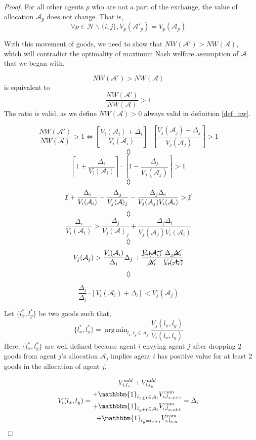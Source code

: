 \begin{proof}
For all other agents $p$ who are not a part of the exchange, the value of allocation $\mathcal{A}_p$ does not change. That is, 
\[
    \forall p \in \mathcal{N}\backslash\{i,j\}, V_p(\mathcal{A}'_p) = V_p(\mathcal{A}_p)
\]

With this movement of goods, we need to show that $NW(\mathcal{A}') > NW(\mathcal{A})$, which will contradict the optimality of maximum Nash welfare assumption of $\mathcal{A}$ that we began with.

\[
    NW(\mathcal{A}') > NW(\mathcal{A})
\]
is equivalent to
\[
    \frac{NW(\mathcal{A}')}{NW(\mathcal{A})} > 1
\]
The ratio is valid, as we define $NW(\mathcal{A}) > 0$ always valid in definition \ref{def_nw}.

$$
    \frac{NW(\mathcal{A}')}{NW(\mathcal{A})} > 1 \Leftrightarrow \left[ \frac{V_i(\mathcal{A}_i) + \Delta_i}{V_i(\mathcal{A}_i)} \right] \cdot \left[ \frac{V_j(\mathcal{A}_j) - \Delta_j}{V_j(\mathcal{A}_j)} \right] > 1
$$
$$\Updownarrow $$
$$
    \left[1 + \frac{\Delta_i}{V_i(\mathcal{A}_i)}\right] \cdot \left[1 - \frac{\Delta_j}{V_j(\mathcal{A}_j)}\right] > 1
$$
$$\Updownarrow $$
$$
    \cancel{1} + \frac{\Delta_i}{V_i(\mathcal{A}_i)} - \frac{\Delta_j}{V_j(\mathcal{A})_j} - \frac{\Delta_j \Delta_i}{V_j(\mathcal{A}_j) V_i(\mathcal{A}_i)} > \cancel{1}
$$
$$\Updownarrow $$
$$
    \frac{\Delta_i}{V_i(\mathcal{A}_i)} > \frac{\Delta_j}{V_j(\mathcal{A})_j} + \frac{\Delta_j \Delta_i}{V_j(\mathcal{A}_j) V_i(\mathcal{A}_i)}
$$
$$\Updownarrow $$
$$
    V_j(\mathcal{A}_j) > \frac{V_i(\mathcal{A}_i)}{\Delta_i} \Delta_j + \frac{\cancel{V_i(\mathcal{A}_i)}}{\cancel{\Delta_i}} \frac{\Delta_j \cancel{\Delta_i}}{\cancel{V_i(\mathcal{A}_i)}}
$$
$$\Updownarrow $$

\begin{equation}
\label{eq_prooffinal}
    \frac{\Delta_j}{\Delta_i} \cdot \left[V_i(\mathcal{A}_i) + \Delta_i \right] < V_j(\mathcal{A}_j)
\end{equation}

Let $\{l_x^*, l_y^*\}$ be two goods such that,
\[
    \{l_x^*, l_y^*\} = \operatorname{arg\,min}_{l_x,l_y \in \mathcal{A}_j} \frac{V_j(l_x,l_y)}{V_i(l_x,l_y)}
\]
Here, $\{l_x^*, l_y^*\}$ are well defined because agent $i$ envying agent $j$ after dropping 2 goods from agent $j$'s allocation $\mathcal{A}_j$ implies agent $i$ has positive value for at least 2 goods in the allocation of agent $j$.

\[
    V_i(l_x,l_y) = 
    \begin{gathered}
        V_{i,l_x}^{add} + V_{i,l_y}^{add} \\
        + \mathbbm{1}_{l_{x \pm 1} \in \mathcal{A}_i}V_{i,l_{x,x\pm 1}}^{com} \\
        + \mathbbm{1}_{l_{y \pm 1} \in \mathcal{A}_i}V_{i,l_{y,y\pm 1}}^{com} \\
        + \mathbbm{1}_{l_y = l_{x \pm 1}}V_{i,l_{x,y}}^{com}
    \end{gathered}
    = \Delta_i
\]


\end{proof}
